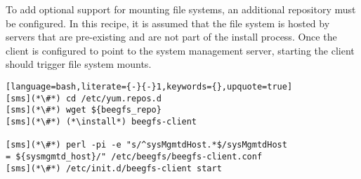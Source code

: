 To add optional support for mounting \beegfs{} file systems, an 
additional \pkgmgr{} repository must be configured. In this recipe, it is
assumed that the \beegfs{} file system is hosted by servers that are pre-existing
and are not part of the install process. Once the client is configured to point 
to the \beegfs{} system management server, starting the client should trigger file 
system mounts.

\begin{lstlisting}[language=bash,literate={-}{-}1,keywords={},upquote=true]
[sms](*\#*) cd /etc/yum.repos.d
[sms](*\#*) wget ${beegfs_repo}
[sms](*\#*) (*\install*) beegfs-client

[sms](*\#*) perl -pi -e "s/^sysMgmtdHost.*$/sysMgmtdHost                  = ${sysmgmtd_host}/" /etc/beegfs/beegfs-client.conf
[sms](*\#*) /etc/init.d/beegfs-client start
\end{lstlisting}
